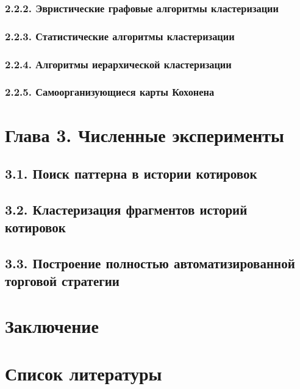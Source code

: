 \documentclass[12pt]{article}
\begin{document}
\subsubsection{2.2.2. Эвристические графовые алгоритмы кластеризации}
\subsubsection{2.2.3. Статистические алгоритмы кластеризации}
\subsubsection{2.2.4. Алгоритмы иерархической кластеризации}
\subsubsection{2.2.5. Самоорганизующиеся карты Кохонена}
\section{Глава 3. Численные эксперименты}
\subsection{3.1. Поиск паттерна в истории котировок}
\subsection{3.2. Кластеризация фрагментов историй котировок}
\subsection{3.3. Построение полностью автоматизированной торговой стратегии}
\section{Заключение}
\section{Список литературы}
\end{document}
